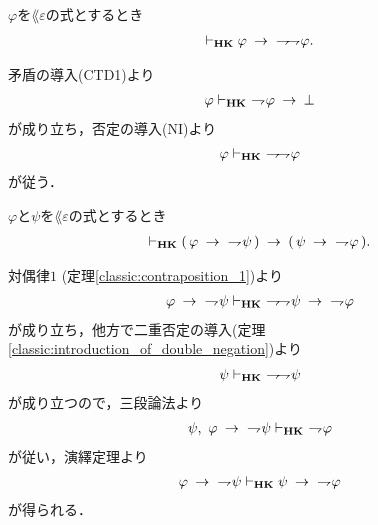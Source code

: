 	\begin{screen}
		\begin{thm}[二重否定の導入]
		\label{classic:introduction_of_double_negation}
			$\varphi$を$\lang{\varepsilon}$の式とするとき
			\begin{align}
				\vdash_{{\scriptsize \mbox{{\bf HK}}}} \varphi \hspace{0.25em}\rightarrow\hspace{0.25em}\ \rightharpoondown\hspace{-0.25em} \rightharpoondown\hspace{-0.25em} \varphi.
			\end{align}
		\end{thm}
	\end{screen}
	
	\begin{sketch}
		矛盾の導入(CTD1)より
		\begin{align}
			\varphi \vdash_{{\scriptsize \mbox{{\bf HK}}}}\ \rightharpoondown\hspace{-0.25em} \varphi \hspace{0.25em}\rightarrow\hspace{0.25em} \bot
		\end{align}
		が成り立ち，否定の導入(NI)より
		\begin{align}
			\varphi \vdash_{{\scriptsize \mbox{{\bf HK}}}}\ \rightharpoondown\hspace{-0.25em} \rightharpoondown\hspace{-0.25em} \varphi
		\end{align}
		が従う．
		\QED
	\end{sketch}
	
	\begin{screen}
		\begin{thm}[対偶律$2$]\label{classic:contraposition_2}
			$\varphi$と$\psi$を$\lang{\varepsilon}$の式とするとき
			\begin{align}
				\provable{\mbox{{\bf HK}}} (\, \varphi \rarrow\ \negation \psi\, )
				\rarrow (\, \psi \rarrow\ \negation \varphi\, ).
			\end{align}
		\end{thm}
	\end{screen}
	
	\begin{sketch}
		対偶律$1$ (定理\ref{classic:contraposition_1})より
		\begin{align}
			\varphi \rarrow\ \negation \psi \provable{\mbox{{\bf HK}}}\ 
			\negation \negation \psi \rarrow\ \negation \varphi
		\end{align}
		が成り立ち，他方で二重否定の導入(定理\ref{classic:introduction_of_double_negation})より
		\begin{align}
			\psi \vdash_{{\scriptsize \mbox{{\bf HK}}}}\ \rightharpoondown\hspace{-0.25em} \rightharpoondown\hspace{-0.25em} \psi
		\end{align}
		が成り立つので，三段論法より
		\begin{align}
			\psi,\ \varphi \rarrow\ \negation \psi \provable{\mbox{{\bf HK}}}\ 
			\negation \varphi
		\end{align}
		が従い，演繹定理より
		\begin{align}
			\varphi \hspace{0.25em}\rightarrow\hspace{0.25em}\ \rightharpoondown\hspace{-0.25em} \psi \vdash_{{\scriptsize \mbox{{\bf HK}}}}
			\psi \hspace{0.25em}\rightarrow\hspace{0.25em}\ \rightharpoondown\hspace{-0.25em} \varphi
		\end{align}
		が得られる．
		\QED
	\end{sketch}
	
